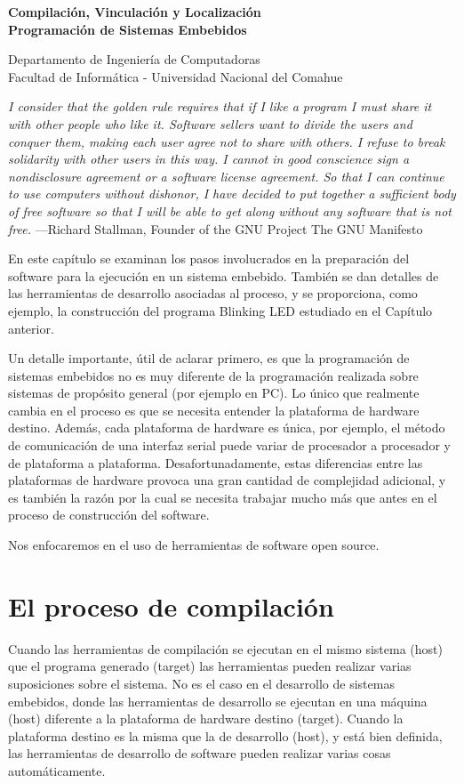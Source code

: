 \documentclass[12pt]{article}
\def\maketitle{

 \makeatletter
 {\color{bl} \centering \huge \sc \textbf{
 Compilación, Vinculación y Localización\\ 
\large \vspace*{-8pt} \color{black} Programación de Sistemas Embebidos
 \vspace*{8pt} }\par}
 \makeatother


 \makeatletter
 {\centering \small 
 	Departamento de Ingeniería de Computadoras \\
 	Facultad de Informática - Universidad Nacional del Comahue \\
 	\vspace{20pt} }
 \makeatother

}
\begin{document}
\thispagestyle{empty}
\maketitle
\setlength{\parindent}{0pt}

{\it I consider that the golden rule requires that if I like a program I must share it with other people who like
it. Software sellers want to divide the users and conquer them, making each user agree not to share with
others. I refuse to break solidarity with other users in this way. I cannot in good conscience sign a
nondisclosure agreement or a software license agreement. So that I can continue to use computers
without dishonor, I have decided to put together a sufficient body of free software so that I will be able
to get along without any software that is not free.}
—Richard Stallman, Founder of the GNU Project The GNU Manifesto


En este capítulo se examinan los pasos involucrados en la preparación
del software para la ejecución en un sistema embebido.
También se dan detalles de las herramientas de desarrollo asociadas
al proceso, y se proporciona, como ejemplo, la
construcción del programa Blinking LED estudiado en el Capítulo anterior.

Un detalle importante, útil de aclarar primero, es que la programación
de sistemas embebidos no es muy diferente de la programación
realizada sobre sistemas de propósito general (por ejemplo en PC).
Lo único que realmente cambia en el proceso es que se necesita 
entender la plataforma de hardware destino. Además, cada 
plataforma de hardware es única, por ejemplo, el método de comunicación
de una interfaz serial puede variar de procesador a procesador y de plataforma
a plataforma.
Desafortunadamente, estas diferencias entre las plataformas de hardware
provoca una gran cantidad de complejidad adicional, y es también la razón
por la cual se necesita trabajar mucho más que antes en el proceso de construcción
del software.

Nos enfocaremos en el uso de herramientas de software open source.


\section *{El proceso de compilación}

Cuando las herramientas de compilación se ejecutan en el mismo sistema (host)
que el programa generado (target) las herramientas pueden realizar
varias suposiciones sobre el sistema.
No es el caso en el desarrollo de sistemas embebidos, donde las herramientas
de desarrollo se ejecutan en una máquina (host) diferente a la plataforma
de hardware destino (target).
Cuando la plataforma destino es la misma que la de desarrollo (host), y está
bien definida, las herramientas de
desarrollo de software pueden realizar varias cosas automáticamente.
 
\end{document}
